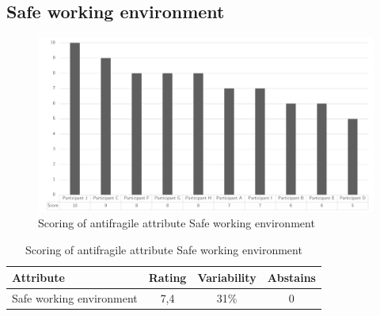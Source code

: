 \subsection{Safe working environment}
\begin{figure}[h!]
	\centering
	\includegraphics[width=0.9\linewidth]{images/scoreafsafeworkingenvironnment}
	\caption[Scoring of antifragile attribute Safe working environment]{Scoring of antifragile attribute Safe working environment}
	\label{fig:appscoringafsafeworkingenvironnment}
\end{figure}
\begin{table}[h!]
	\centering
	\begin{tabular}{p{}ccc}
		\toprule
		\textbf{Attribute} & \textbf{Rating} & \textbf{Variability} & \textbf{Abstains} \\
		\midrule
		Safe working environment & 7,4 & 31\% & 0 \\%
		\bottomrule
	\end{tabular}%
	\caption[Scoring of antifragile attribute Safe working environment]{Scoring of antifragile attribute Safe working environment}
	\label{tab:appscoringafsafeworkingenvironment}%
\end{table}%
\newpage
